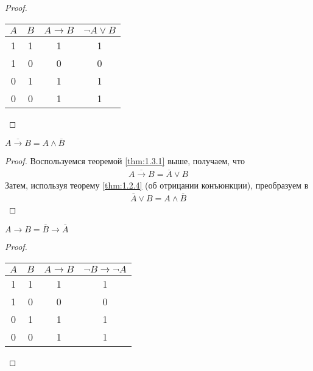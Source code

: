 \begin{proof}
	\hfill \break \break
	\begin{center}
		\begin{tabular}{ |c|c|c|c| } 
			\hline
			$A$ & $B$ & $A \rightarrow B$ & $\neg A \lor B$ \\
			\hline 
			1 & 1 & 1 & 1 \\ 
			1 & 0 & 0 & 0 \\
			0 & 1 & 1 & 1 \\ 
			0 & 0 & 1 & 1 \\  
			\hline
		\end{tabular}
	\end{center}
\end{proof}

\begin{theorem}
	$\overline{A \rightarrow B} = A \land \overline{B}$
\end{theorem}

\begin{proof}
	Воспользуемся теоремой \ref{thm:1.3.1} выше, получаем, что
	\begin{align*}
		\overline{A \rightarrow B} = \overline{A} \lor B 
	\end{align*}
	Затем, используя теорему \ref{thm:1.2.4} (об отрицании конъюнкции), преобразуем в
	\begin{align*}
		\overline{A} \lor B = A \land \overline{B}
	\end{align*} 
	
\end{proof}

\newpage

\begin{theorem} \label{thm:1.3.3}
	$A \rightarrow B = \overline{B} \rightarrow \overline{A}$
\end{theorem}

\begin{proof}
	\hfill \break \break
	\begin{center}
		\begin{tabular}{ |c|c|c|c| } 
			\hline
			$A$ & $B$ & $A \rightarrow B$ & $\neg B \rightarrow \neg A$ \\
			\hline 
			1 & 1 & 1 & 1 \\ 
			1 & 0 & 0 & 0 \\
			0 & 1 & 1 & 1 \\ 
			0 & 0 & 1 & 1 \\  
			\hline
		\end{tabular}
	\end{center}
\end{proof}

